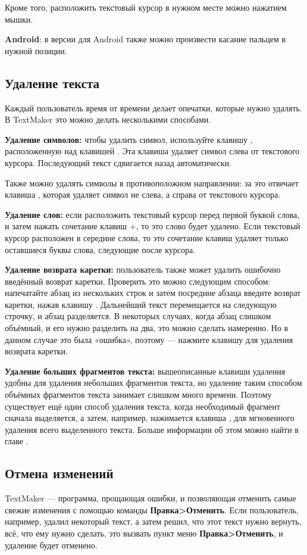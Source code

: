 ﻿\documentclass[a4paper,10pt]{article}
\begin{document}
Кроме того, расположить текстовый курсор в нужном месте можно нажатием мышки.

\textbf{Android}: в версии для Android также можно произвести касание пальцем в нужной позиции.

\subsection{Удаление текста}
Каждый пользователь время от времени делает опечатки, которые нужно удалять. В TextMaker это можно делать несколькими способами. 

\textbf{Удаление символов:} чтобы удалить символ, используйте клавишу , расположенную над клавишей . Эта клавиша удаляет символ слева от текстового курсора. Последующий текст сдвигается назад автоматически.

Также можно удалять символы в противоположном направлении: за это отвечает клавиша , которая удаляет символ не слева, а справа от текстового курсора.

\textbf{Удаление слов:} если расположить текстовый курсор перед первой буквой слова, и затем нажать сочетание клавиш +, то это слово будет удалено. Если текстовый курсор расположен в середине слова, то это сочетание клавиш удаляет только оставшиеся буквы слова, следующие после курсора.

\textbf{Удаление возврата каретки:} пользователь также может удалить ошибочно введённый возврат каретки. Проверить это можно следующим способом: напечатайте абзац из нескольких строк и затем посредине абзаца введите возврат каретки, нажав клавишу . Дальнейший текст перемещается на следующую строчку, и абзац разделяется. В некоторых случаях, когда абзац слишком объёмный, и его нужно  разделить на два, это можно сделать намеренно. Но в данном случае это была «ошибка», поэтому — нажмите клавишу  для удаления возврата каретки.

\textbf{Удаление больших фрагментов текста:} вышеописанные клавиши удаления удобны для удаления небольших фрагментов текста, но удаление таким способом объёмных фрагментов текста занимает слишком много времени. Поэтому существует ещё один способ удаления текста, когда необходимый фрагмент сначала выделяется, а затем, например, нажимается клавиша , для мгновенного удаления всего выделенного текста. Больше информации об этом можно найти в главе .

\subsection{Отмена изменений} \label{sec:отменаизм}
TextMaker — программа, прощающая ошибки, и позволяющая отменить самые свежие изменения с помощью команды \textbf{Правка>Отменить}. Если пользователь, например, удалил некоторый текст, а затем решил, что этот текст нужно вернуть, всё, что ему нужно сделать, это вызвать пункт меню \textbf{Правка>Отменить}, и удаление будет отменено.
\end{document}
